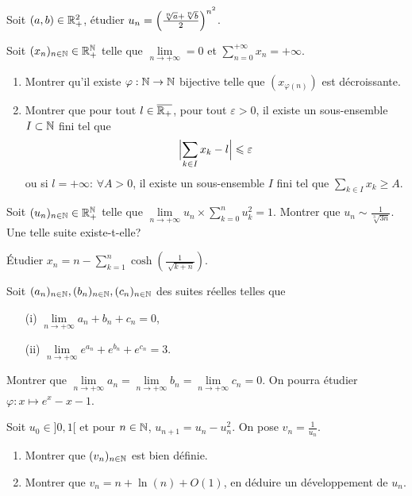 \begin{exercise}
	Soit $(a,b)\in\mathbb{R}_{+}^{2}$, étudier
	$u_{n}=\Bigl(\frac{\sqrt[n]{a}+\sqrt[n]{b}}{2}\Bigr)^{n^{2}}$.
\end{exercise}

\begin{exercise}
	Soit $(x_{n})_{n\in\mathbb{N}}\in\mathbb{R}_{+}^{\mathbb{N}}$ telle que $\lim\limits_{n\to+\infty}=0$
	et $\sum_{n=0}^{+\infty}x_{n}=+\infty$.
	\begin{enumerate}
		\item
		Montrer qu'il existe $\varphi:\mathbb{N}\to\mathbb{N}$ bijective telle que
		$(x_{\varphi(n)})$ est décroissante.
		\item
		Montrer que pour tout $l\in\overline{\mathbb{R}_{+}}$, pour tout $\varepsilon>0$,
		il existe un sous-ensemble $I\subset\mathbb{N}$ fini tel que
		$$\Bigl\vert\sum_{k\in I}x_{k}-l\Bigr\vert\leqslant\varepsilon$$ ou si
		$l=+\infty$: $\forall A>0$, il existe un sous-ensemble $I$ fini tel que
		$\sum_{k\in I}x_{k}\geqslant A$.
	\end{enumerate}
\end{exercise}

\begin{exercise}
	Soit $(u_{n})_{n\in\mathbb{N}}\in\mathbb{R}_{+}^{\mathbb{N}}$ telle que
	$\lim\limits_{n\to+\infty}u_{n}\times\sum_{k=0}^{n}u_{k}^{2}=1$. Montrer que
	$u_{n}\sim\frac{1}{\sqrt[3]{3n}}$. Une telle suite existe-t-elle?
\end{exercise}

\begin{exercise}
	Étudier $x_{n}=n-\sum_{k=1}^{n}\cosh(\frac{1}{\sqrt[]{k+n}})$.
\end{exercise}

\begin{exercise}
	Soit $(a_{n})_{n\in\mathbb{N}},(b_{n})_{n\in\mathbb{N}},(c_{n})_{n\in\mathbb{N}}$ des suites réelles
	telles que 
	\begin{enumerate}
		\item
		[(i)] $\lim\limits_{n\to+\infty}a_{n}+b_{n}+c_{n}=0$,
		\item [(ii)]
		$\lim\limits_{n\to+\infty}e^{a_{n}}+e^{b_{n}}+e^{c_{n}}=3$.
	\end{enumerate}
	Montrer que
	$\lim\limits_{n\to+\infty}a_{n}=\lim\limits_{n\to+\infty}b_{n}=\lim\limits_{n\to+\infty}c_{n}=0$.
	On pourra étudier $\varphi:x\mapsto e^{x}-x-1$.
\end{exercise}

\begin{exercise}
	Soit $u_{0}\in]0,1[$ et pour $n\in\mathbb{N}$, $u_{n+1}=u_{n}-u_{n}^{2}$. On pose
	$v_{n}=\frac{1}{u_{n}}$.
	\begin{enumerate}
		\item
		Montrer que $(v_{n})_{n\in\mathbb{N}}$ est bien définie.
		\item
		Montrer que $v_{n}=n+\ln(n)+O(1)$, en déduire un développement de $u_{n}$.
	\end{enumerate}
\end{exercise}

